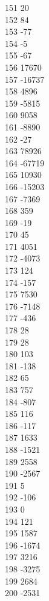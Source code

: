 { 151	20 \\
 152	84 \\
 153	-77 \\
 154	-5 \\
 155	-67 \\
 156	17670 \\
 157	-16737 \\
 158	4896 \\
 159	-5815 \\
 160	9058 \\
 161	-8890 \\
 162	-27 \\
 163	78926 \\
 164	-67719 \\
 165	10930 \\
 166	-15203 \\
 167	-7369 \\
 168	359 \\
 169	-19 \\
 170	45 \\
 171	4051 \\
 172	-4073 \\
 173	124 \\
 174	-157 \\
 175	7530 \\
 176	-7148 \\
 177	-436 \\
 178	28 \\
 179	28 \\
 180	103 \\
 181	-138 \\
 182	65 \\
 183	757 \\
 184	-807 \\
 185	116 \\
 186	-117 \\
 187	1633 \\
 188	-1521 \\
 189	2558 \\
 190	-2567 \\
 191	5 \\
 192	-106 \\
 193	0 \\
 194	121 \\
 195	1587 \\
 196	-1674 \\
 197	3216 \\
 198	-3275 \\
 199	2684 \\
 200	-2531 \\
}
